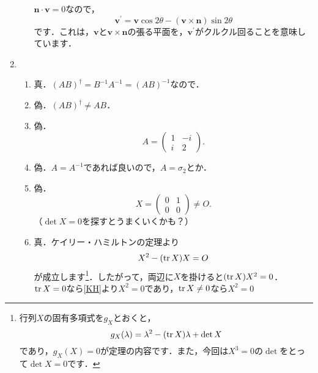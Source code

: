\documentclass[a4paper,pdflatex,ja=standard]{bxjsarticle}
\begin{document}
\begin{enumerate}
\begin{enumerate}
    $\bm{n}\cdot\bm{v}=0$なので，
    \begin{equation}
      \bm{v}^{\prime}
      =
      \bm{v}\cos 2\theta
      -
      (\bm{v}\times\bm{n})\sin 2\theta
    \end{equation}
    です．これは，$\bm{v}$と$\bm{v}\times\bm{n}$の張る平面を，$\bm{v}^{\prime}$がクルクル回ることを意味しています．


  \end{enumerate}


  \item 

  \begin{enumerate}

    \item 

    真．$(AB)^{\dag}=B^{-1}A^{-1}=(AB)^{-1}$なので．

    \item 

    偽．$(AB)^{\dag}\neq AB$．

    \item 

    偽．
    $$
      A
      =
      \begin{pmatrix}
        1 & -i \\
        i & 2
      \end{pmatrix}
      .
    $$

    \item 

    偽．$A=A^{-1}$であれば良いので，$A=\sigma_{2}$とか．

    \item 

    偽．
    $$
      X
      =
      \begin{pmatrix}
        0 & 1 \\
        0 & 0
      \end{pmatrix}
      \neq 
      O
      .
    $$
    （$\det X=0$を探すとうまくいくかも？）

    \item 

    真．ケイリー・ハミルトンの定理より
    \begin{equation}
      X^2
      -
      (\tr X)X
      =
      O
      \label{KH}
    \end{equation}
    が成立します\footnote{
     行列$X$の固有多項式を$g_X$とおくと，
     $$
      g_X(\lambda)
      =
      \lambda^2
      -
      (\tr X) \lambda
      +
      \det X
     $$ 
     であり，$g_X(X)=0$が定理の内容です．また，今回は$X^3=0$の$\det$をとって$\det X=0$です．
    }．したがって，両辺に$X$を掛けると$(\tr X)X^2=0$．$\tr X=0$なら\eqref{KH}より$X^2=0$であり，$\tr X\neq 0$なら$X^2=0$


  \end{enumerate}


\end{enumerate}
\end{document}
